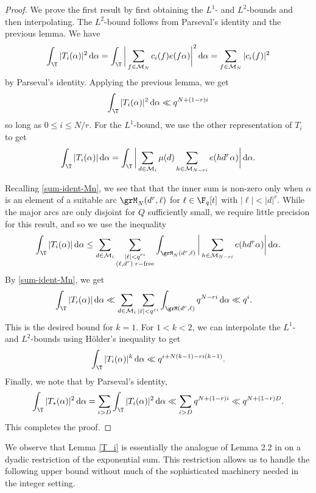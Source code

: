 \documentclass[reqno,11pt]{amsart}
\theoremstyle{definition}
\theoremstyle{remark}
\numberwithin{equation}{section}
\def\calM{{\mathcal M}}
\renewcommand{\d}{\,{\rm d}} %
\newcommand{\<}{\begin{equation}}
\renewcommand{\>}{\end{equation}}
\begin{document}
\begin{proof}
    We prove the first result by first obtaining the $L^1$- and $L^2$-bounds and then interpolating. The $L^2$-bound follows from Parseval's identity and the previous lemma. We have
    \[
        \int_\T |T_i(\alpha)|^2\d\alpha = \int_\T \bigg|\sum_{f \in \calM_N} c_i(f)e(f\alpha)\bigg|^2 \d\alpha = \sum_{f \in \calM_N} |c_i(f)|^2 
    \]
    by Parseval's identity. Applying the previous lemma, we get
    \[
        \int_\T |T_i(\alpha)|^2 \d\alpha \ll q^{N+(1-r)i}
    \]
    so long as $0 \leq i \leq N/r$. For the $L^1$-bound, we use the other representation of $T_i$ to get
    \[\int_\T|T_i(\alpha)| \d\alpha = \int_\T \bigg|\sum_{d \in \calM_i} \mu(d)\sum_{h \in \calM_{N-ri}} e(hd^r\alpha)\bigg|\d\alpha.\]
    
    Recalling \eqref{sum-ident-Mn}, we see that that the inner sum is non-zero only when $\alpha$ is an element of a suitable arc $\grM_N(d^r,\ell)$ for $\ell \in \F_q[t]$ with $|\ell| < |d|^r$. While the major arcs are only disjoint for $Q$ sufficiently small, we require little precision for this result, and so we use the inequality
    \[\int_\T |T_i(\alpha)| \d\alpha \leq \sum_{d \in \calM_i} \sum_{\substack{|\ell| < q^{ri} \\ (\ell,d^r)\;r{\rm -free}}}\int_{\grM_N(d^r,\ell)} \bigg|\sum_{h \in \calM_{N-ri}} e(hd^r \alpha)\bigg|\d\alpha.\]
    By \eqref{sum-ident-Mn}, we get
    \begin{align*}
        \int_\T|T_i(\alpha)| \d\alpha &\ll \sum_{d \in \calM_i}\sum_{|\ell| < q^{ri}}\int_{\grM(d^r,\ell)} q^{N-ri}\d\alpha \ll q^i.
    \end{align*}
    This is the desired bound for $k=1$. For $1 < k < 2$, we can interpolate the $L^1$- and $L^2$-bounds using H\"older's inequality to get
    \[\int_\T |T_i(\alpha)|^k \d\alpha \ll q^{i+N(k-1)-ri(k-1)}.\]
    Finally, we note that by Parseval's identity,
    \[\int_\T |T_*(\alpha)|^2 \d\alpha = \sum_{i>D}\int_\T |T_i(\alpha)|^2 \d\alpha \ll \sum_{i>D} q^{N+(1-r)i} \ll q^{N+(1-r)D}.\]
    This completes the proof.
\end{proof}

We observe that Lemma \ref{T_i} is essentially the analogue of Lemma 2.2 in \cite{keil:2013} on a dyadic restriction of the exponential sum. This restriction allows us to handle the following upper bound without much of the sophisticated machinery needed in the integer setting.
\end{document}
